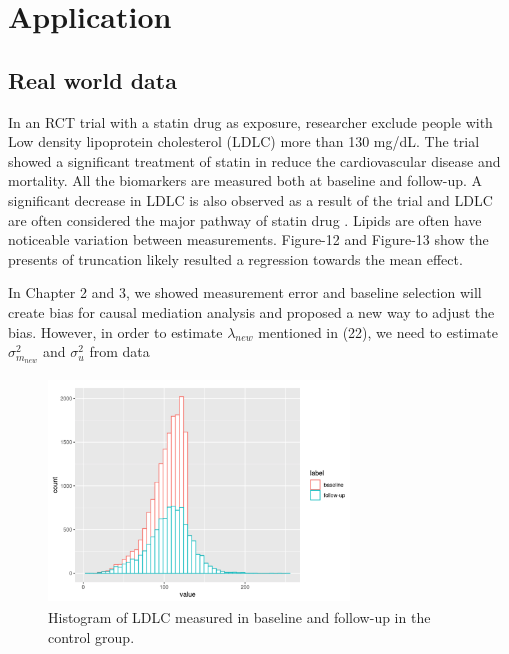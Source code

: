 \documentclass{article}
\begin{document}
\pagebreak
\clearpage

\section{Application}

\subsection{Real world data}

In an RCT trial with a statin drug as exposure, researcher exclude people with Low density lipoprotein cholesterol (LDLC) more than 130 mg/dL\cite{ridker2008rosuvastatin}.  The trial showed a significant treatment of statin in reduce the cardiovascular disease and mortality. All the biomarkers are measured both at baseline and follow-up. A significant decrease in LDLC is also observed as a result of the trial and LDLC are often considered the major pathway of statin drug \cite{chen2000direct}\cite{stancu2001statins}. Lipids are often have noticeable variation between measurements.  Figure-12 and Figure-13 show the presents of truncation likely resulted a regression towards the mean effect. 


In Chapter 2 and 3, we showed measurement error and baseline selection will create bias for causal mediation analysis and proposed a new way to adjust the bias. However, in order to estimate $\lambda_{new}$ mentioned in (22), we need to estimate $\sigma^2_{m_{new}}$ and $\sigma^2_u$ from data


\begin{figure}[h]
\centering
\includegraphics[width = 8cm,height = 6cm]{figure-10.png}
\caption{Histogram of LDLC measured in baseline and follow-up in the control group.}
\label{fig10}
\end{figure}
\end{document}
